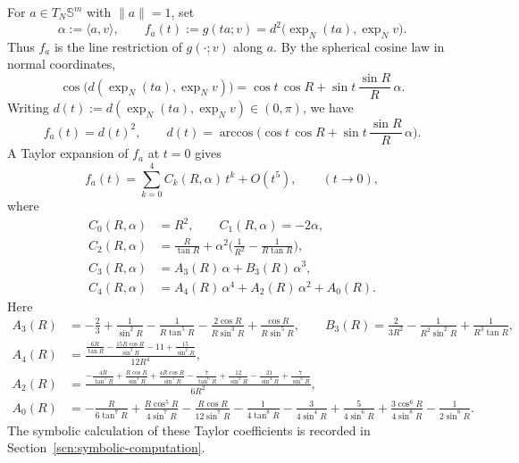 \documentclass{amsart}
\theoremstyle{definition}
\theoremstyle{remark}
\newcommand\0{\boldsymbol{0}}
\begin{document}
For $a\in T_{N}\mathbb{S}^{m}$ with $\|a\|=1$, set
\[
\alpha:=\langle a,v\rangle,
\qquad
f_{a}(t):=g(ta;v)=d^{2}\big(\exp_{N}(ta),\exp_{N}v\big).
\]
Thus \(f_a\) is the line restriction of \(g(\cdot;v)\) along \(a\).  By the spherical cosine law in normal coordinates,
\begin{equation}\label{eqn:f_a}
\cos\big(d(\exp_{N}(ta),\exp_{N}v)\big)
=
\cos t\,\cos R
+
\sin t\,\frac{\sin R}{R}\,\alpha.
\end{equation}
Writing \(d(t):=d(\exp_{N}(ta),\exp_{N}v)\in(0,\pi)\), we have
\[
f_{a}(t)=d(t)^{2},
\qquad
d(t)=\arccos\!\Big(\cos t\,\cos R+\sin t\,\frac{\sin R}{R}\,\alpha\Big).
\]
A Taylor expansion of \(f_a\) at \(t=0\) gives
\[
f_{a}(t)=\sum_{k=0}^{4} C_{k}(R,\alpha)\,t^{k}+O(t^{5}),
\qquad (t\to 0),
\]
where
\begin{equation}\label{eqn:C}
\boxed{
\begin{aligned}
C_{0}(R,\alpha)&=R^{2},
\qquad
C_{1}(R,\alpha)=-2\alpha,\\
C_{2}(R,\alpha)&=\frac{R}{\tan R}+\alpha^{2}\Big(\frac{1}{R^{2}}-\frac{1}{R\tan R}\Big),\\
C_{3}(R,\alpha)&=A_{3}(R)\,\alpha+B_{3}(R)\,\alpha^{3},\\
C_{4}(R,\alpha)&=A_{4}(R)\,\alpha^{4}+A_{2}(R)\,\alpha^{2}+A_{0}(R).
\end{aligned}
}
\end{equation}
Here
\begin{equation}\label{eqn:A-B}
\boxed{
\begin{aligned}
A_{3}(R)&= - \frac{2}{3} + \frac{1}{\sin^{2} R} - \frac{1}{R \tan^{5} R}
- \frac{2\cos R}{R \sin^{3} R} + \frac{\cos R}{R \sin^{5} R},
\qquad
B_{3}(R)= \frac{2}{3 R^{2}} - \frac{1}{R^{2}\sin^{2} R} + \frac{1}{R^{3}\tan R},\\
A_{4}(R)&=\frac{\frac{6 R}{\tan R} - \frac{15 R \cos R}{\sin^{3} R} - 11 + \frac{15}{\sin^{2} R}}{12 R^{4}},\\
A_{2}(R)&=\frac{- \frac{4 R}{\tan^{5} R} + \frac{R \cos R}{\sin^{3} R} + \frac{4 R \cos R}{\sin^{5} R}
- \frac{7}{\tan^{6} R} + \frac{12}{\sin^{2} R} - \frac{21}{\sin^{4} R} + \frac{7}{\sin^{6} R}}{6 R^{2}},\\
A_{0}(R)&=
- \frac{R}{6 \tan^{7} R} + \frac{R \cos^{5} R}{4 \sin^{7} R} - \frac{R \cos R}{12 \sin^{7} R}
- \frac{1}{4 \tan^{8} R} - \frac{3}{4 \sin^{4} R} + \frac{5}{4 \sin^{6} R}
+ \frac{3 \cos^{6} R}{4 \sin^{8} R} - \frac{1}{2 \sin^{8} R}.
\end{aligned}
}
\end{equation}
The symbolic calculation of these Taylor coefficients is recorded in Section~\ref{scn:symbolic-computation}.
\end{document}
